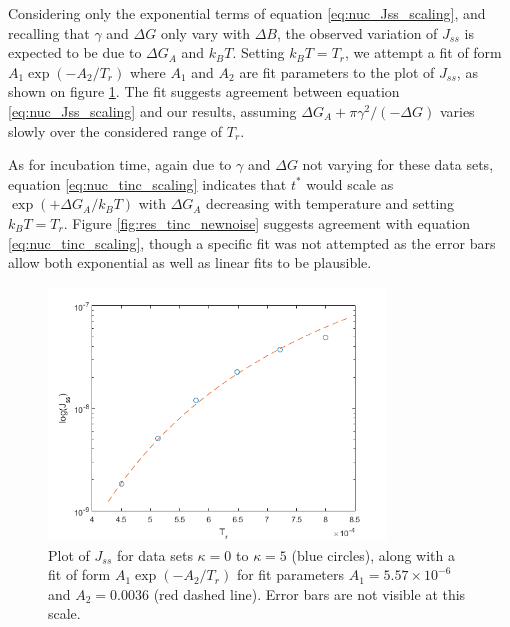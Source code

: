Considering only the exponential terms of equation \ref{eq:nuc_Jss_scaling}, and recalling that $\gamma$ and $\Delta G$ only vary with $\Delta B$, the observed variation of $J_{ss}$ is expected to be due to $\Delta G_A$ and $k_B T$. Setting $k_B T = T_r$, we attempt a fit of form $A_1\exp(-A_2/T_r)$ where $A_1$ and $A_2$ are fit parameters to the plot of $J_{ss}$, as shown on figure \ref{fig:res_Jss_newnoise}. The fit suggests agreement between equation \ref{eq:nuc_Jss_scaling} and our results, assuming $\Delta G_A+\pi\gamma^2/(-\Delta G)$ varies slowly over the considered range of $T_r$.

As for incubation time, again due to $\gamma$ and $\Delta G$ not varying for these data sets, equation \ref{eq:nuc_tinc_scaling} indicates that $t^*$ would scale as $\exp(+\Delta G_A/k_B T)$ with $\Delta G_A$ decreasing with temperature and setting $k_B T = T_r$. Figure \ref{fig:res_tinc_newnoise} suggests agreement with equation \ref{eq:nuc_tinc_scaling}, though a specific fit was not attempted as the error bars allow both exponential as well as linear fits to be plausible.

\begin{figure}[h]
	\centering
	\includegraphics[width=0.8\textwidth]{fig_res/res_Jss_newnoise_Trfit}
	\caption{Plot of $J_{ss}$ for data sets $\kappa=0$ to $\kappa=5$ (blue circles), along with a fit of form $A_1\exp(-A_2/T_r)$ for fit parameters $A_1=5.57\times 10^{-6}$ and $A_2=0.0036$ (red dashed line). Error bars are not visible at this scale. }\label{fig:res_Jss_newnoise}
\end{figure}

